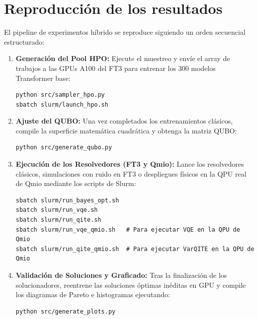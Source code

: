 \section{Reproducción de los resultados}

El pipeline de experimentos híbrido se reproduce siguiendo un orden secuencial estructurado:

\begin{enumerate}
    \item \textbf{Generación del Pool HPO:} Ejecute el muestreo y envíe el array de trabajos a las GPUs A100 del FT3 para entrenar los 300 modelos Transformer base:
    \begin{verbatim}
python src/sampler_hpo.py
sbatch slurm/launch_hpo.sh
    \end{verbatim}
    
    \item \textbf{Ajuste del QUBO:} Una vez completados los entrenamientos clásicos, compile la superficie matemática cuadrática y obtenga la matriz QUBO:
    \begin{verbatim}
python src/generate_qubo.py
    \end{verbatim}
    
    \item \textbf{Ejecución de los Resolvedores (FT3 y Qmio):} Lance los resolvedores clásicos, simulaciones con ruido en FT3 o despliegues físicos en la QPU real de Qmio mediante los scripts de Slurm:
    \begin{verbatim}
sbatch slurm/run_bayes_opt.sh
sbatch slurm/run_vqe.sh
sbatch slurm/run_qite.sh
sbatch slurm/run_vqe_qmio.sh   # Para ejecutar VQE en la QPU de Qmio
sbatch slurm/run_qite_qmio.sh  # Para ejecutar VarQITE en la QPU de Qmio
    \end{verbatim}
    
    \item \textbf{Validación de Soluciones y Graficado:} Tras la finalización de los solucionadores, reentrene las soluciones óptimas inéditas en GPU y compile los diagramas de Pareto e histogramas ejecutando:
    \begin{verbatim}
python src/generate_plots.py
    \end{verbatim}
\end{enumerate}

